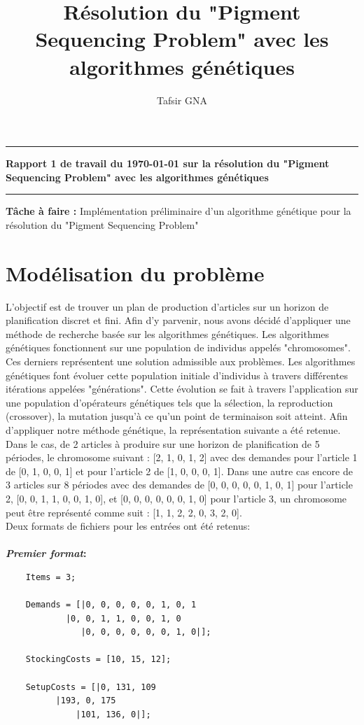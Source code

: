\documentclass[11pt,a4paper]{article}
\author{Tafsir GNA}
\title{Résolution du "Pigment Sequencing Problem" avec les algorithmes génétiques}
\begin{document}
\hrule
\begin{center}
	\textbf{Rapport 1 de travail du \today{} sur la résolution du "Pigment Sequencing Problem" avec les algorithmes génétiques}
\end{center} 
\hrule

\begin{center}
	\textbf{Tâche à faire :} Implémentation préliminaire d'un algorithme génétique pour la résolution du "Pigment Sequencing Problem" 
\end{center}

\section{Modélisation du problème}
	L'objectif est de trouver un plan de production d'articles sur un horizon de planification discret et fini. Afin d'y parvenir, nous avons décidé d'appliquer une méthode de recherche basée sur les algorithmes génétiques. Les algorithmes génétiques fonctionnent sur une population de individus appelés "chromosomes". Ces derniers représentent une solution admissible aux problèmes. Les algorithmes génétiques font évoluer cette population initiale d'individus à travers différentes itérations appelées "générations". Cette évolution se fait à travers l'application sur une population d'opérateurs génétiques tels que la sélection, la reproduction (crossover), la mutation jusqu'à ce qu'un point de terminaison soit atteint. Afin d'appliquer notre méthode génétique, la représentation suivante a été retenue. \\
	\hspace*{.5cm} Dans le cas, de 2 articles à produire sur une horizon de planification de 5 périodes, le chromosome suivant : [2, 1, 0, 1, 2] avec des demandes pour l'article 1 de [0, 1, 0, 0, 1] et pour l'article 2 de [1, 0, 0, 0, 1]. Dans une autre cas encore de 3 articles sur 8 périodes avec des demandes de [0, 0, 0, 0, 0, 1, 0, 1] pour l'article 2, [0, 0, 1, 1, 0, 0, 1, 0], et [0, 0, 0, 0, 0, 0, 1, 0] pour l'article 3, un chromosome peut être représenté comme suit : [1, 1, 2, 2, 0, 3, 2, 0]. \\
	\hspace*{.5cm} Deux formats de fichiers pour les entrées ont été retenus:\\
	\\
	\hspace*{.5cm} \textbf{\emph{Premier format}:}
	\begin{verbatim}
	Items = 3;

	Demands = [|0, 0, 0, 0, 0, 1, 0, 1
			|0, 0, 1, 1, 0, 0, 1, 0
	   		   |0, 0, 0, 0, 0, 0, 1, 0|];

	StockingCosts = [10, 15, 12];

	SetupCosts = [|0, 131, 109
	      |193, 0, 175
              |101, 136, 0|];
	\end{verbatim}
	
\end{document}
